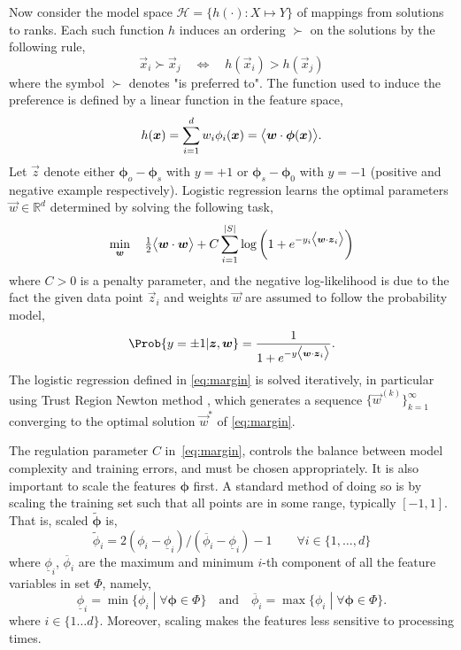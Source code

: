 \documentclass[smallextended]{svjour3}
\renewcommand{\vphi}{\bm \phi}
\begin{document}
Now consider the model space $\mathcal{H} = \{h(\cdot) : X \mapsto Y\}$ of mappings from solutions to ranks. Each such function $h$ induces an ordering $\succ$ on the solutions  by the following rule,
\begin{equation}\label{eq:linear}
\vec{x}_i \succ \vec{x}_j \quad \Leftrightarrow \quad h(\vec{x}_i) > h(\vec{x}_j)
\end{equation}
where the symbol $\succ$ denotes "is preferred to".  The function used to induce the preference is defined by a linear function in the feature space,
\begin{equation}\label{eq:jssp:linweights}
h(\vec{x})=\sum_{i=1}^d w_i\phi_i(\vec{x})=\inner{\vec{w}}{\vphi(\vec{x})}.
\end{equation}
Let $\vec{z}$ denote either $\vphi_o-\vphi_s$ with $y=+1$ or $\vphi_s-\vphi_0$ with $y=-1$ (positive and negative example respectively). Logistic regression learns the optimal parameters $\vec{w}\in\mathbb{R}^d$ determined by solving the following task, 
\begin{equation}\label{eq:margin}
\min_{\vec{w}}\quad \tfrac{1}{2}\inner{\vec{w}}{\vec{w}} + C \sum_{i=1}^{\abs{S}} \log\left(1 + e^{-y_i \inner{\vec{w}}{\vec{z}_i}}\right) 
\end{equation}
where $C > 0$ is a penalty parameter, and the negative log-likelihood is due to the fact the given data point $\vec{z}_i$ and weights $\vec{w}$ are assumed to follow the probability model,
\begin{equation}\label{eq:prob}
\Prob{y=\pm1|\vec{z},\vec{w}}=\frac{1}{1+e^{-y\inner{\vec{w}}{\vec{z}_i}}}.
\end{equation}
The logistic regression defined in \eqref{eq:margin} is solved iteratively, in particular using Trust Region Newton method \cite{Lin08:newtontrustregion}, which generates a sequence $\{\vec{w}^{(k)}\}_{k=1}^\infty$ converging to the optimal solution $\vec{w}^*$ of \eqref{eq:margin}.

The regulation parameter $C$ in~\eqref{eq:margin}, controls the balance between model complexity and training errors, and must be chosen appropriately. It is also important to scale the features $\vphi$ first. A standard method of doing so is by scaling the training set such that all points are in some range, typically $[-1,1]$. That is, scaled $\tilde{\vphi}$ is,
\begin{equation}\label{eq:scale}
\tilde{\phi}_i = 2 (\phi_i - \underline{\phi}_i) / (\overline{\phi}_i - \underline{\phi}_i) - 1 
\quad\quad \forall i\in\{1,\ldots,d\}
\end{equation}
where $\underline{\phi}_i$, $\overline{\phi}_i$ are the maximum and minimum $i$-th component of all the feature variables in set $\Phi$, namely,
\begin{equation}
\underline{\phi}_i=\min\{\phi_i\;|\;\forall\vphi\in \Phi\} \quad\textrm{and}\quad \overline{\phi}_i=\max\{\phi_i\;|\;\forall\vphi\in \Phi\}.
\end{equation}
where $i\in\{1\ldots d\}$. Moreover, scaling makes the features less sensitive to processing times.
\end{document}
